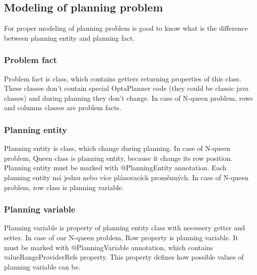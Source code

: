 \subsection{Modeling of planning problem}
For proper modeling of planning problem is good to know what is the difference between planning entity and planning fact. 
 
\subsubsection{Problem fact}
Problem fact is class, which contains getters returning properties of this class. These classes don't contain special OptaPlanner code (they could be classic java classes) and during planning they don't change. In case of N-queen problem, rows and columns classes are problem facts.

\subsubsection{Planning entity}
Planning entity is class, which change during planning.  In case of N-queen problem, Queen class is planning entity, because it change its row position. Planning entity must be marked with @PlanningEntity annotation. Each planning entity má jednu nebo více plánovacích proměnných. In case of N-queen problem, row class is planning variable.

\subsubsection{Planning variable}
Planning variable is property of planning entity class with necessery getter and setter. In case of our N-queen problem, Row property is planning variable. It must be marked with @PlanningVariable annotation, which contains valueRangeProviderRefs property. This property defines how possible values of planning variable can be.

